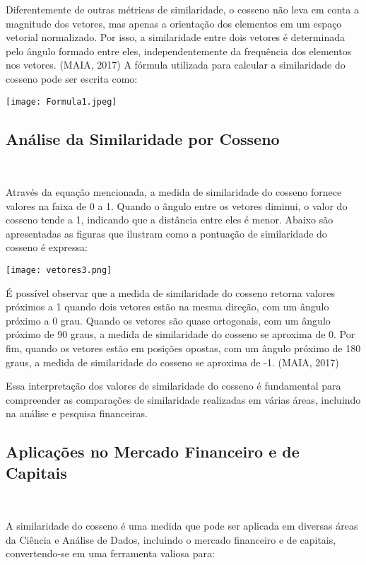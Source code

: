 \documentclass[12pt, a4paper]{article}
\begin{document}
Diferentemente de outras métricas de similaridade, o cosseno não leva em conta a magnitude dos vetores, mas apenas a orientação dos elementos em um espaço vetorial normalizado. Por isso, a similaridade entre dois vetores é determinada pelo ângulo formado entre eles, independentemente da frequência dos elementos nos vetores. (MAIA, 2017) A fórmula utilizada para calcular a similaridade do cosseno pode ser escrita como: \\

\begin{center}
     \texttt{[image: Formula1.jpeg]}
\end{center}

\subsection{Análise da Similaridade por Cosseno}\

Através da equação mencionada, a medida de similaridade do cosseno fornece valores na faixa de 0 a 1. Quando o ângulo entre os vetores diminui, o valor do cosseno tende a 1, indicando que a distância entre eles é menor. Abaixo são apresentadas as figuras que ilustram como a pontuação de similaridade do cosseno é expressa:\\

\begin{center}
     \texttt{[image: vetores3.png]}
\end{center}

É possível observar que a medida de similaridade do cosseno retorna valores próximos a 1 quando dois vetores estão na mesma direção, com um ângulo próximo a 0 grau. Quando os vetores são quase ortogonais, com um ângulo próximo de 90 graus, a medida de similaridade do cosseno se aproxima de 0. Por fim, quando os vetores estão em posições opostas, com um ângulo próximo de 180 graus, a medida de similaridade do cosseno se aproxima de -1. (MAIA, 2017)
\

Essa interpretação dos valores de similaridade do cosseno é fundamental para compreender as comparações de similaridade realizadas em várias áreas, incluindo na análise e pesquisa financeiras. 

\subsection{Aplicações no Mercado Financeiro e de Capitais}\

A similaridade do cosseno é uma medida que pode ser aplicada em diversas áreas da Ciência e Análise de Dados, incluindo o mercado financeiro e de capitais, convertendo-se em uma ferramenta valiosa para:
\end{document}
